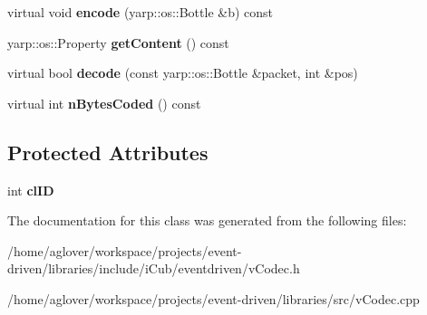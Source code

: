\begin{DoxyCompactItemize}
\item 
virtual void {\bfseries encode} (yarp\+::os\+::\+Bottle \&b) const \hypertarget{classev_1_1AddressEventClustered_a969434b89a4120a2f96e2b8d7b36a518}{}\label{classev_1_1AddressEventClustered_a969434b89a4120a2f96e2b8d7b36a518}

\item 
yarp\+::os\+::\+Property {\bfseries get\+Content} () const \hypertarget{classev_1_1AddressEventClustered_aa8e4111a73fb6e209cc1d7a8c84d00f8}{}\label{classev_1_1AddressEventClustered_aa8e4111a73fb6e209cc1d7a8c84d00f8}

\item 
virtual bool {\bfseries decode} (const yarp\+::os\+::\+Bottle \&packet, int \&pos)\hypertarget{classev_1_1AddressEventClustered_ad11d10722ceea22d306199bee7e3f562}{}\label{classev_1_1AddressEventClustered_ad11d10722ceea22d306199bee7e3f562}

\item 
virtual int {\bfseries n\+Bytes\+Coded} () const \hypertarget{classev_1_1AddressEventClustered_ad492d8b43964c80c39a34b657dae8a34}{}\label{classev_1_1AddressEventClustered_ad492d8b43964c80c39a34b657dae8a34}

\end{DoxyCompactItemize}
\subsection*{Protected Attributes}
\begin{DoxyCompactItemize}
\item 
int {\bfseries cl\+ID}\hypertarget{classev_1_1AddressEventClustered_a1a4756c2a181d863d3f577e3f83e8afd}{}\label{classev_1_1AddressEventClustered_a1a4756c2a181d863d3f577e3f83e8afd}

\end{DoxyCompactItemize}


The documentation for this class was generated from the following files\+:\begin{DoxyCompactItemize}
\item 
/home/aglover/workspace/projects/event-\/driven/libraries/include/i\+Cub/eventdriven/v\+Codec.\+h\item 
/home/aglover/workspace/projects/event-\/driven/libraries/src/v\+Codec.\+cpp\end{DoxyCompactItemize}
